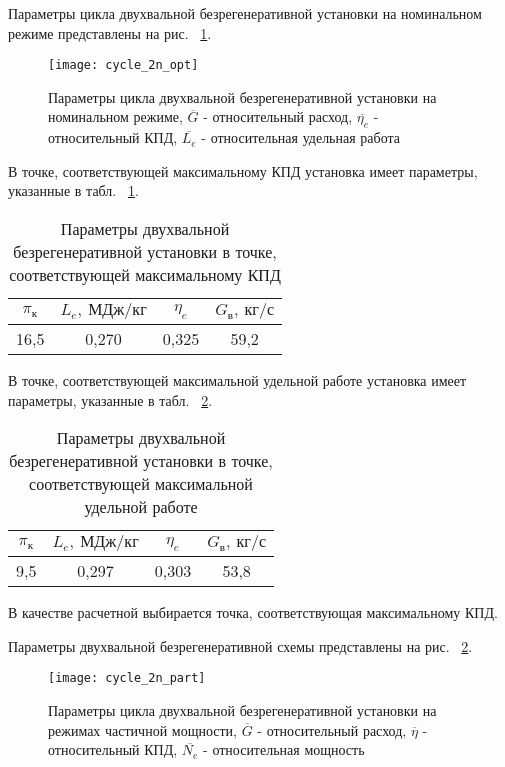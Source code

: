 Параметры цикла двухвальной безрегенеративной установки на номинальном режиме представлены на рис. ~\ref{img:cycle_2n_opt}.

\begin{figure}[H]
    \centering
    \texttt{[image: cycle\_2n\_opt]}
    \caption{Параметры цикла двухвальной безрегенеративной установки на номинальном режиме,
	$\overline{G}$ - относительный расход, $\overline{\eta_e}$ - относительный КПД, $\overline{L_e}$ - относительная удельная работа}
    \label{img:cycle_2n_opt}
\end{figure}

В точке, соответствующей максимальному КПД установка имеет параметры, указанные в табл. ~\ref{tab:cycle_2n_max_eta}.

\clearpage
\begin{longtable}{|c|c|c|c|}
	\caption{Параметры двухвальной безрегенеративной установки в точке, соответствующей максимальному КПД}
	\label{tab:cycle_2n_max_eta}
	\hline
	\textbf{$\pi_к$} & \textbf{$L_e, \ МДж/кг$} & \textbf{$\eta_e$} & \textbf{$G_в, \ кг/с$} \\ \hline
	16,5 & 0,270 & 0,325 & 59,2 \\ \hline
\end{longtable}


В точке, соответствующей максимальной удельной работе установка имеет параметры, указанные в табл. ~\ref{tab:cycle_2n_max_labour}.
\begin{longtable}{|c|c|c|c|}
	\caption{Параметры двухвальной безрегенеративной установки в точке, соответствующей максимальной удельной работе} 
	\label{tab:cycle_2n_max_labour}
	\hline
	\textbf{$\pi_к$} & \textbf{$L_e, \ МДж/кг$} & \textbf{$\eta_e$} & \textbf{$G_в, \ кг/с$} \\ \hline
	9,5 & 0,297 & 0,303 & 53,8 \\ \hline
\end{longtable}

В качестве расчетной выбирается точка, соответствующая максимальному КПД.

Параметры двухвальной безрегенеративной схемы представлены на рис. ~\ref{img:cycle_2n_part}.

\begin{figure}[H]
    \centering
    \texttt{[image: cycle\_2n\_part]}
    \caption{Параметры цикла двухвальной безрегенеративной установки на режимах частичной мощности,
	$\overline{G}$ - относительный расход, $\overline{\eta}$ - относительный КПД, $\overline{N_e}$ - относительная мощность}
    \label{img:cycle_2n_part}
\end{figure}

